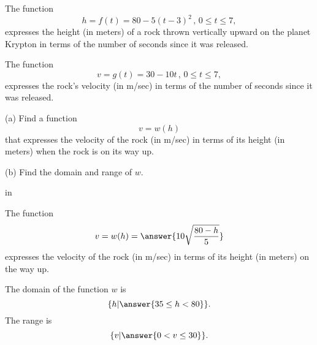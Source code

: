 \documentclass{ximera}
\newcommand{\pskip}{\vskip 0.1 in}
\begin{document}
\begin{question}  \label{Q9331435rfe}
The function
\[
   h = f(t) = 80 - 5(t-3)^2 \, , \, 0\leq t \leq 7 , 
\]
expresses the height (in meters) of a rock thrown vertically upward on the planet Krypton in terms of the number of seconds since it was released.

The function
\[
   v = g(t) = 30 - 10t \, , \, 0\leq t \leq 7 ,
\]
expresses the rock's velocity (in m/sec) in terms of the number of seconds since it was released.

(a) Find a function 
\[
       v = w(h)
\]
that expresses the velocity of the rock (in m/sec) in terms of its height (in meters) when the rock is on its way up.

(b) Find the domain and range of $w$.

\pskip

The function
\[
       v = w(h)  = \answer{10\sqrt{\frac{80-h}{5}}}
\]
expresses the velocity of the rock (in m/sec) in terms of its height (in meters) on the way up.

The domain of the function $w$ is
\[
            \{ h | \answer{35 \leq h < 80} \}.
\] 
The range is
\[
   \{ v | \answer{0 < v \leq 30} \}.
\]


\end{question}
\end{document}
